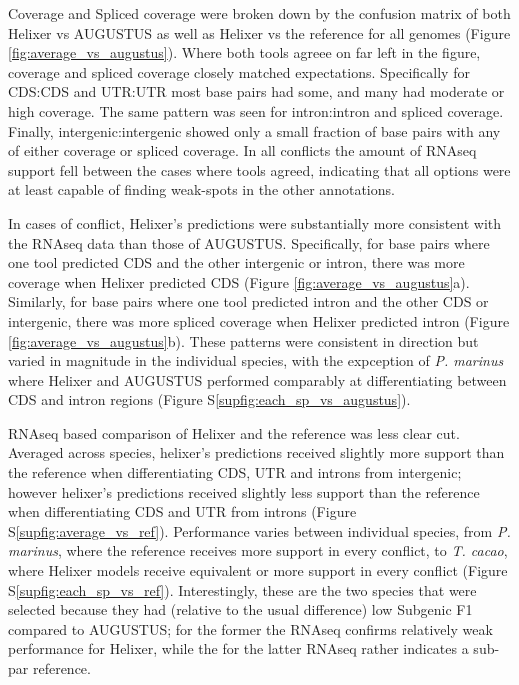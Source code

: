 \documentclass{bioinfo}
\newcounter{supfig}
\begin{document}
Coverage and Spliced coverage were broken down by the confusion matrix of both
Helixer vs AUGUSTUS as well as Helixer vs the reference for all genomes (Figure \ref{fig:average_vs_augustus}). %
Where both tools agreee on far left in the figure, coverage and spliced coverage closely matched expectations. 
Specifically for CDS:CDS and UTR:UTR most base pairs had some, and many
had moderate or high coverage. The same pattern was seen for intron:intron and spliced
coverage. Finally, intergenic:intergenic showed only a small fraction of base pairs with 
any of either coverage or spliced coverage. In all conflicts the amount of RNAseq support
fell between the cases where tools agreed, indicating that all options were at least
capable of finding weak-spots in the other annotations.

In cases of conflict, Helixer's predictions were substantially more consistent with
the RNAseq data than those of AUGUSTUS. Specifically, for base pairs where one tool predicted CDS and
the other intergenic or intron, there was more coverage when 
Helixer predicted CDS (Figure \ref{fig:average_vs_augustus}a). Similarly, for base pairs where one tool predicted intron and the other 
CDS or intergenic, there was more spliced coverage when Helixer predicted intron (Figure \ref{fig:average_vs_augustus}b). 
These patterns were consistent in direction but varied in magnitude in the individual species,
with the expception of {\it P. marinus} where Helixer and AUGUSTUS performed comparably
at differentiating between CDS and intron regions (Figure S\ref{supfig:each_sp_vs_augustus}).

RNAseq based comparison of Helixer and the reference was less clear cut.
Averaged across species, helixer's predictions received slightly more support
than the reference when differentiating CDS, UTR and introns from intergenic;
however helixer's predictions received slightly less support than the reference 
when differentiating CDS and UTR from introns (Figure S\ref{supfig:average_vs_ref}). Performance varies between individual
species, from {\it P. marinus}, where the reference receives more support
in every conflict, to {\it T. cacao}, where Helixer models receive equivalent
or more support in every conflict (Figure S\ref{supfig:each_sp_vs_ref}). Interestingly, these are the two species that
were selected because they had (relative to the usual difference) low Subgenic F1 compared to 
AUGUSTUS; for the former the RNAseq confirms relatively weak performance for Helixer, while the 
for the latter RNAseq rather indicates a sub-par reference. 
\end{document}
